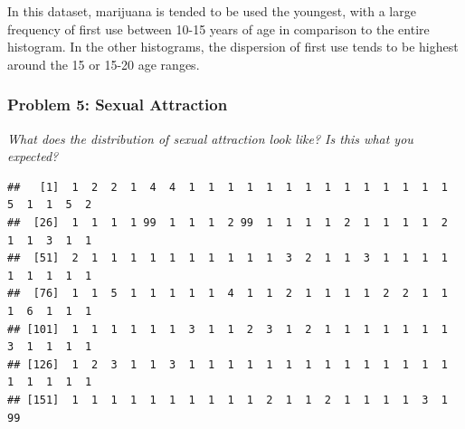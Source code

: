 \documentclass[
]{article}
\newenvironment{Shaded}{\begin{snugshade}}{\end{snugshade}}
\newcommand{\AttributeTok}[1]{\textcolor[rgb]{0.77,0.63,0.00}{#1}}
\newcommand{\ControlFlowTok}[1]{\textcolor[rgb]{0.13,0.29,0.53}{\textbf{#1}}}
\newcommand{\FunctionTok}[1]{\textcolor[rgb]{0.00,0.00,0.00}{#1}}
\newcommand{\NormalTok}[1]{#1}
\newcommand{\OtherTok}[1]{\textcolor[rgb]{0.56,0.35,0.01}{#1}}
\newcommand{\SpecialCharTok}[1]{\textcolor[rgb]{0.00,0.00,0.00}{#1}}
\newcommand{\StringTok}[1]{\textcolor[rgb]{0.31,0.60,0.02}{#1}}
\begin{document}
In this dataset, marijuana is tended to be used the youngest, with a
large frequency of first use between 10-15 years of age in comparison to
the entire histogram. In the other histograms, the dispersion of first
use tends to be highest around the 15 or 15-20 age ranges.

\hypertarget{problem-5-sexual-attraction}{%
\subsubsection{Problem 5: Sexual
Attraction}\label{problem-5-sexual-attraction}}

\emph{What does the distribution of sexual attraction look like? Is this
what you expected?}

\begin{Shaded}
\end{Shaded}

\begin{verbatim}
##   [1]  1  2  2  1  4  4  1  1  1  1  1  1  1  1  1  1  1  1  1  1  5  1  1  5  2
##  [26]  1  1  1  1 99  1  1  1  2 99  1  1  1  1  2  1  1  1  1  2  1  1  3  1  1
##  [51]  2  1  1  1  1  1  1  1  1  1  1  3  2  1  1  3  1  1  1  1  1  1  1  1  1
##  [76]  1  1  5  1  1  1  1  1  4  1  1  2  1  1  1  1  2  2  1  1  1  6  1  1  1
## [101]  1  1  1  1  1  1  3  1  1  2  3  1  2  1  1  1  1  1  1  1  3  1  1  1  1
## [126]  1  2  3  1  1  3  1  1  1  1  1  1  1  1  1  1  1  1  1  1  1  1  1  1  1
## [151]  1  1  1  1  1  1  1  1  1  1  2  1  1  2  1  1  1  1  3  1 99
\end{verbatim}

\begin{Shaded}
\end{Shaded}
\end{document}
